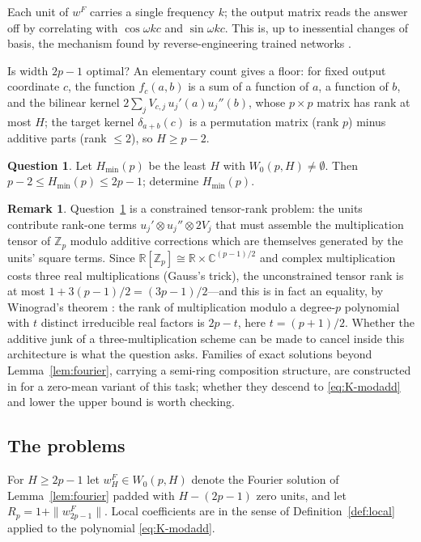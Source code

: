 \documentclass[11pt]{amsart}
\theoremstyle{plain}
\theoremstyle{definition}
\newtheorem{question}[theorem]{Question}
\newtheorem{remark}[theorem]{Remark}
\newcommand{\R}{\mathbb{R}}
\newcommand{\Z}{\mathbb{Z}}
\begin{document}
Each unit of $w^F$ carries a single frequency $k$; the output matrix reads the answer off by correlating with $\cos \omega k c$ and $\sin \omega k c$. This is, up to inessential changes of basis, the mechanism found by reverse-engineering trained networks \cite{nanda2023}.

Is width $2p-1$ optimal? An elementary count gives a floor: for fixed output coordinate $c$, the function $f_c(a,b)$ is a sum of a function of $a$, a function of $b$, and the bilinear kernel $2\sum_j V_{c,j}\, u_j'(a) u_j''(b)$, whose $p \times p$ matrix has rank at most $H$; the target kernel $\delta_{a+b}(c)$ is a permutation matrix (rank $p$) minus additive parts (rank $\le 2$), so $H \ge p - 2$.

\begin{question}\label{q:width}
Let $H_{\min}(p)$ be the least $H$ with $W_0(p,H) \neq \emptyset$. Then $p - 2 \le H_{\min}(p) \le 2p - 1$; determine $H_{\min}(p)$.
\end{question}

\begin{remark}
Question~\ref{q:width} is a constrained tensor-rank problem: the units contribute rank-one terms $u_j' \otimes u_j'' \otimes 2V_j$ that must assemble the multiplication tensor of $\Z_p$ modulo additive corrections which are themselves generated by the units' square terms. Since $\R[\Z_p] \cong \R \times \mathbb{C}^{(p-1)/2}$ and complex multiplication costs three real multiplications (Gauss's trick), the unconstrained tensor rank is at most $1 + 3(p-1)/2 = (3p-1)/2$---and this is in fact an equality, by Winograd's theorem \cite{winograd1977}: the rank of multiplication modulo a degree-$p$ polynomial with $t$ distinct irreducible real factors is $2p - t$, here $t = (p+1)/2$. Whether the additive junk of a three-multiplication scheme can be made to cancel inside this architecture is what the question asks. Families of exact solutions beyond Lemma~\ref{lem:fourier}, carrying a semi-ring composition structure, are constructed in \cite{tian2024} for a zero-mean variant of this task; whether they descend to \eqref{eq:K-modadd} and lower the upper bound is worth checking.
\end{remark}

\subsection{The problems}

For $H \ge 2p-1$ let $w^F_H \in W_0(p,H)$ denote the Fourier solution of Lemma~\ref{lem:fourier} padded with $H - (2p-1)$ zero units, and let $R_p = 1 + \|w^F_{2p-1}\|$. Local coefficients are in the sense of Definition~\ref{def:local} applied to the polynomial \eqref{eq:K-modadd}.
\end{document}
